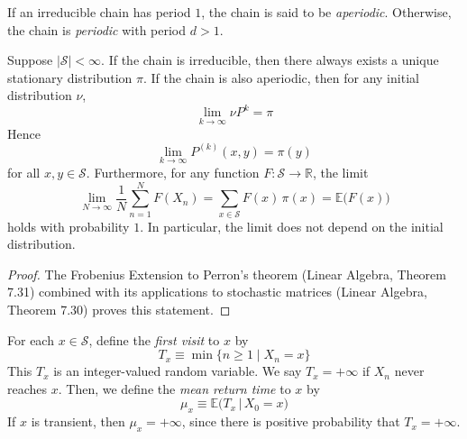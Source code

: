 \documentclass{article}
\begin{document}
    \begin{definition}
      If an irreducible chain has period $1$, the chain is said to be \textit{aperiodic}. Otherwise, the chain is \textit{periodic} with period $d > 1$. 
    \end{definition}

    \begin{theorem}
      Suppose $|\mathcal{S}| < \infty$. If the chain is irreducible, then there always exists a unique stationary distribution $\pi$. If the chain is also aperiodic, then for any initial distribution $\nu$, 
      \begin{equation}
        \lim_{k \rightarrow \infty} \nu P^k = \pi
      \end{equation}
      Hence
      \begin{equation}
        \lim_{k \rightarrow \infty} P^{(k)}(x, y) = \pi(y)
      \end{equation}
      for all $x, y \in \mathcal{S}$. Furthermore, for any function $F: \mathcal{S} \longrightarrow \mathbb{R}$, the limit
      \begin{equation}
        \lim_{N \rightarrow \infty} \frac{1}{N} \sum_{n=1}^N F(X_n) = \sum_{x \in \mathcal{S}} F(x)\, \pi(x) = \mathbb{E} \big( F(x) \big)
      \end{equation}
      holds with probability $1$. In particular, the limit does not depend on the initial distribution. 
    \end{theorem}
    \begin{proof}
      The Frobenius Extension to Perron's theorem (Linear Algebra, Theorem 7.31) combined with its applications to stochastic matrices (Linear Algebra, Theorem 7.30) proves this statement. 
    \end{proof}

    \begin{definition}
      For each $x \in \mathcal{S}$, define the \textit{first visit} to $x$ by 
      \begin{equation}
        T_x \equiv \min\{ n \geq 1 \; | \; X_n = x\}
      \end{equation}
      This $T_x$ is an integer-valued random variable. We say $T_x = + \infty$ if $X_n$ never reaches $x$. Then, we define the \textit{mean return time} to $x$ by 
      \begin{equation}
        \mu_x \equiv \mathbb{E}\big( T_x \, | \, X_0 = x)
      \end{equation}
      If $x$ is transient, then $\mu_x = + \infty$, since there is positive probability that $T_x = + \infty$. 
    \end{definition}
\end{document}
